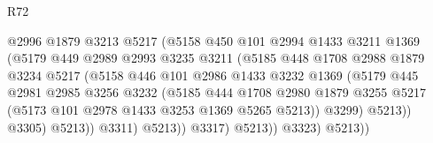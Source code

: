 \begin{lexlean}{R72}
\begin{coremodule}
                                    @2996
                                    @1879
                                    @3213
                                    @5217
                                    (@5158
                                      @450
                                      @101
                                      @2994
                                      @1433
                                      @3211
                                      @1369
                                      (@5179
                                        @449
                                        @2989
                                        @2993
                                        @3235
                                        @3211
                                        (@5185
                                          @448
                                          @1708
                                          @2988
                                          @1879
                                          @3234
                                          @5217
                                          (@5158
                                            @446
                                            @101
                                            @2986
                                            @1433
                                            @3232
                                            @1369
                                            (@5179
                                              @445
                                              @2981
                                              @2985
                                              @3256
                                              @3232
                                              (@5185
                                                @444
                                                @1708
                                                @2980
                                                @1879
                                                @3255
                                                @5217
                                                (@5173 @101 @2978 @1433 @3253 @1369 @5265 @5213))
                                              @3299)
                                            @5213))
                                        @3305)
                                      @5213))
                                  @3311)
                                @5213))
                            @3317)
                          @5213))
                      @3323)
                    @5213))

\end{coremodule}
\end{lexlean}
